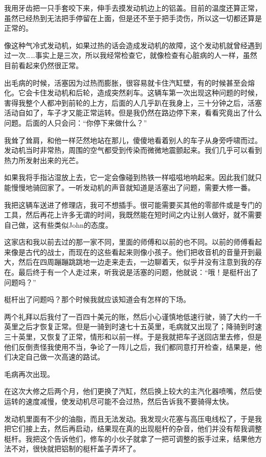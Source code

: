 \documentclass[UTF8]{article}
\begin{document}
\par 我用牙齿把一只手套咬下来，伸手去摸发动机边上的铝盖。目前的温度还算正常，虽然已经热到无法把手停留在上面，但是还不至于把手烫伤，所以这一切都还算是正常的。
\par 像这种气冷式发动机，如果过热的话会造成发动机的故障，这个发动机就曾经遇到过一次……事实上是三次，所以我经常检查它，就像检查有心脏病的人一样，虽然目前看起来仍然很正常。
\par 出毛病的时候，活塞因为过热而膨胀，很容易就卡住汽缸壁，有的时候甚至会熔化。它会卡住发动机和后轮，造成突然刹车。这辆车第一次出现这种问题的时候，害得我整个人都冲到前轮的上方，后面的人几乎趴在我身上，三十分钟之后，活塞活动自如了，车子才又能正常运转。但是我仍然在路边停下来，看看究竟出了什么问题。后面的人只会问：“你停下来做什么？”
\par 我耸了耸肩，和他一样茫然地站在那儿，傻傻地看着别人的车子从身旁呼啸而过。发动机当时非常热，周围的空气都受到传染而微微地震颤起来。我们几乎可以看到热力所发射出来的光芒。
\par 如果我将手指沾湿放上去，它一定会像碰到热铁一样嗞嗞地响起来。因此我们就只能慢慢地骑回家了。一听发动机的声音就知道是活塞出了问题，需要大修一番。
\par 我把这辆车送进了修理店，我可不想插手。很可能需要买其他的零部件或是专门的工具，然后再花上许多无谓的时间，我既然能在短时间之内让别人做好，就不需要自己做，这有些类似John的态度。
\par 这家店和我以前去过的那一家不同，里面的师傅和以前的也不同。以前的师傅看起来像是古代的战士，而现在的这些看起来则像小孩子。他们把收音机的音量开到最大，然后在四周蹦蹦跳跳地一边走来走去，一边聊着天，似乎并没有注意到我的存在。最后终于有一个人走过来，听我说是活塞的问题，他就说：“哦！是梃杆出了问题吗？”
\par 梃杆出了问题吗？那个时候我就应该知道会有怎样的下场。
\par 两个礼拜以后我付了一百四十美元的账，然后小心谨慎地低速行驶，骑了大约一千英里之后才恢复正常。但是一骑到时速七十五英里，毛病就又出现了；降骑到时速三十英里，又恢复了正常，情形和以前一样。于是我就把车子送回店里去修，但是他们反倒责怪我使用不当，争论了一阵儿之后，我们都同意打开检查，结果是，他们决定自己做一次高速的路试。
\par 毛病再次出现。
\par 在这次大修之后两个月，他们更换了汽缸，然后换上较大的主汽化器喷嘴，然后使运转的速度减慢，使发动机尽可能不会过热，然后告诉我不要骑得太快。
\par 发动机里面有不少的油脂，而且无法发动。我发现火花塞与高压电线松了，于是我把它们接上去，然后再启动，结果现在真的出现梃杆的杂音，他们并没有帮我调整梃杆。我把这个告诉他们，修车的小伙子就拿了一把可调整的扳手过来，结果他方法不对，很快就把铝制的梃杆盖子弄坏了。
\end{document}
